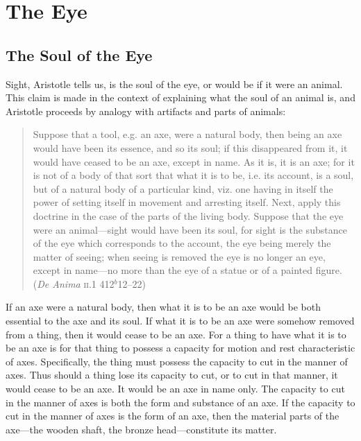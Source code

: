 \chapter{The Eye} %
\label{cha:the_eye}

\section{The Soul of the Eye} %
\label{sec:the_soul_of_the_eye}

Sight, Aristotle tells us, is the soul of the eye, or would be if it were an animal. This claim is made in the context of explaining what the soul of an animal is, and Aristotle proceeds by analogy with artifacts and parts of animals:
\begin{quote}
	Suppose that a tool, e.g. an axe, were a natural body, then being an axe would have been its essence, and so its soul; if this disappeared from it, it would have ceased to be an axe, except in name. As it is, it is an axe; for it is not of a body of that sort that what it is to be, i.e. its account, is a soul, but of a natural body of a particular kind, viz. one having in itself the power of setting itself in movement and arresting itself. Next, apply this doctrine in the case of the parts of the living body. Suppose that the eye were an animal—sight would have been its soul, for sight is the substance of the eye which corresponds to the account, the eye being merely the matter of seeing; when seeing is removed the eye is no longer an eye, except in name—no more than the eye of a statue or of a painted figure. (\emph{De Anima} \textsc{ii}.1 412\( ^{b} \)12--22)
\end{quote}

If an axe were a natural body, then what it is to be an axe would be both essential to the axe and its soul. If what it is to be an axe were somehow removed from a thing, then it would cease to be an axe. For a thing to have what it is to be an axe is for that thing to possess a capacity for motion and rest characteristic of axes. Specifically, the thing must possess the capacity to cut in the manner of axes. Thus should a thing lose its capacity to cut, or to cut in that manner, it would cease to be an axe. It would be an axe in name only. The capacity to cut in the manner of axes is both the form and substance of an axe. If the capacity to cut in the manner of axes is the form of an axe, then the material parts of the axe---the wooden shaft, the bronze head---constitute its matter.

